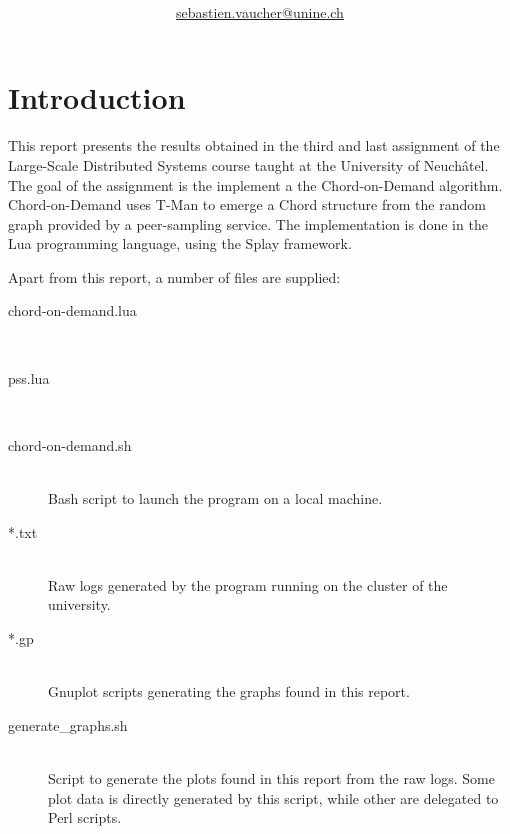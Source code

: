 \documentclass[11pt,a4paper,parskip=half]{scrartcl}
\author{\myauthor\\ \href{mailto:sebastien.vaucher@unine.ch}{sebastien.vaucher@unine.ch}}
\title{\huge \textbf{\mytitle}}
\begin{document}
\begin{titlingpage}

\begin{otherlanguage}{australian}
\maketitle
\end{otherlanguage}

\tableofcontents

\begin{table}[b]
\centering
{}
\qquad\qquad
{}
\end{table}

\end{titlingpage}

\pagebreak

\section{Introduction}

This report presents the results obtained in the third and last assignment of the Large-Scale Distributed Systems course taught at the University of Neuchâtel.
The goal of the assignment is the implement a the Chord-on-Demand \autocite{cod} algorithm.
Chord-on-Demand uses T-Man \autocite{tman} to emerge a Chord \autocite{chord} structure from the random graph provided by a peer-sampling service.
The implementation is done in the Lua programming language, using the Splay framework.

Apart from this report, a number of files are supplied:

\begin{description}
\item[chord-on-demand.lua]\hfill\\
\item[pss.lua]\hfill\\
\item[chord-on-demand.sh]\hfill\\ Bash script to launch the program on a local machine.
\item[*.txt]\hfill\\ Raw logs generated by the program running on the cluster of the university.
\item[*.gp]\hfill\\ Gnuplot scripts generating the graphs found in this report.
\item[generate\_graphs.sh]\hfill\\ Script to generate the plots found in this report from the raw logs. Some plot data is directly generated by this script, while other are delegated to Perl scripts.
\end{description}
\end{document}
